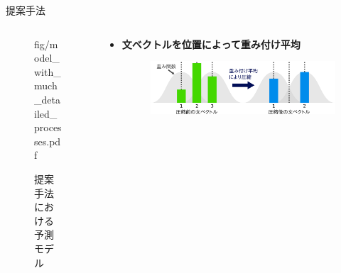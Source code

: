 \documentclass[unicode,10pt]{beamer}
\newlength{\mycolumnwidth}
\newcommand{\arrow}{\textcolor{ttiblue}{\textbf{→}}\hspace{1ex}}
\newcommand{\itemtitle}[1]{\textbf{#1}\\}
\newcommand{\fire}[1]{\textcolor{red}{\textbf{#1}}}
\newcommand{\doublecolumns}[4]{
    \begin{minipage}[t]{#1}
      #2
    \end{minipage}
    \begin{minipage}[t]{#3}
      #4
    \end{minipage}}
\begin{document}
\begin{frame}[t]
\begin{block}{提案手法}
\begin{columns}[onlytextwidth,t]
\begin{column}{\mycolumnwidth}
\begin{figure}
                        {fig/model_with_much_detailed_processes.pdf}
        \caption*{提案手法における予測モデル}
      \end{figure}
    \end{column}

    \begin{column}{\mycolumnwidth}
      \begin{itemize}
        \item \itemtitle{文ベクトルを位置によって重み付け平均}
          \begin{figure}
            \includegraphics[width=\linewidth]
                            {fig/what_are_you_weighting_for.pdf}
          \end{figure}

\end{itemize}
\end{column}
\end{columns}
\end{block}
\end{frame}
\end{document}
